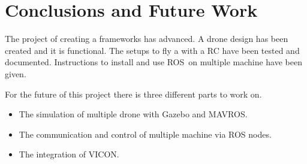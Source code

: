 \chapter{Conclusions and Future Work}
The project of creating a frameworks has advanced.
A drone design has been created and it is functional.
The setups to fly a with a RC have been tested and documented.
Instructions to install and use ROS on multiple machine have been given.

For the future of this project there is three different parts to work on.
\begin{itemize}
  \item The simulation of multiple drone with Gazebo and MAVROS.
  \item The communication and control of multiple machine via ROS nodes.
  \item The integration of VICON.
\end{itemize}
